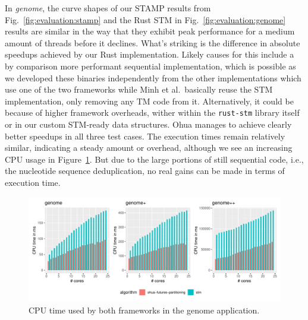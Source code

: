 In \emph{genome}, the curve shapes of our STAMP results from Fig.~\ref{fig:evaluation:stamp} and the Rust STM in Fig.~\ref{fig:evaluation:genome} results are similar in the way that they exhibit peak performance for a medium amount of threads before it declines.
What's striking is the difference in absolute speedups achieved by our Rust implementation.
Likely causes for this include a by comparison more performant sequential implementation, which is possible as we developed these binaries independently from the other implementations which use one of the two frameworks while Minh et al.\ basically reuse the STM implementation, only removing any TM code from it.
Alternatively, it could be because of higher framework overheads, wither within the \texttt{rust-stm} library itself or in our custom STM-ready data structures.
Ohua manages to achieve clearly better speedups in all three test cases.
The execution times remain relatively similar, indicating a steady amount or overhead, although we see an increasing CPU usage in Figure~\ref{fig:evaluation:genome-cpu}.
But due to the large portions of still sequential code, i.e., the nucleotide sequence deduplication, no real gains can be made in terms of execution time.

\begin{figure}
    \centering
    \includegraphics[width=\textwidth,keepaspectratio]{gfx/results/cpu_genome_comb}
    \caption{CPU time used by both frameworks in the genome application.}%
    \label{fig:evaluation:genome-cpu}
\end{figure}


